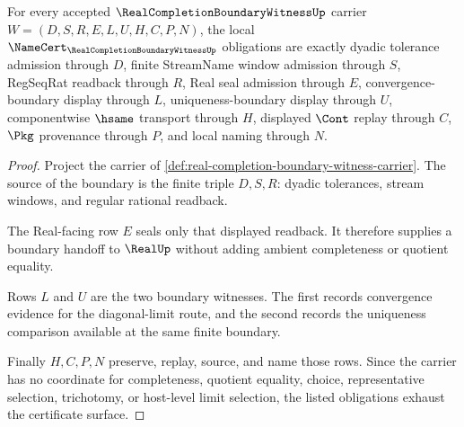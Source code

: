 \begin{theorem}
\label{thm:real-completion-boundary-witness-namecert-obligations}
For every accepted $\RealCompletionBoundaryWitnessUp$ carrier $W=(D,S,R,E,L,U,H,C,P,N)$, the local $\NameCert_{\RealCompletionBoundaryWitnessUp}$ obligations are exactly dyadic tolerance admission through $D$, finite StreamName window admission through $S$, RegSeqRat readback through $R$, Real seal admission through $E$, convergence-boundary display through $L$, uniqueness-boundary display through $U$, componentwise $\hsame$ transport through $H$, displayed $\Cont$ replay through $C$, $\Pkg$ provenance through $P$, and local naming through $N$.
\end{theorem}
\begin{proof}
Project the carrier of \autoref{def:real-completion-boundary-witness-carrier}. The source of the boundary is the finite triple $D,S,R$: dyadic tolerances, stream windows, and regular rational readback.

The Real-facing row $E$ seals only that displayed readback. It therefore supplies a boundary handoff to $\RealUp$ without adding ambient completeness or quotient equality.

Rows $L$ and $U$ are the two boundary witnesses. The first records convergence evidence for the diagonal-limit route, and the second records the uniqueness comparison available at the same finite boundary.

Finally $H,C,P,N$ preserve, replay, source, and name those rows. Since the carrier has no coordinate for completeness, quotient equality, choice, representative selection, trichotomy, or host-level limit selection, the listed obligations exhaust the certificate surface.
\end{proof}


